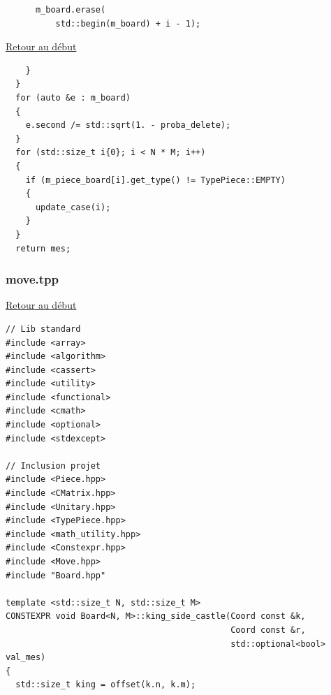 {\begin{frame}[fragile]
\begin{verbatim}
      m_board.erase(
          std::begin(m_board) + i - 1);
\end{verbatim}
\end{frame}

\begin{frame}[fragile]
\hyperlink{conclusion}{Retour au début}\newline
\begin{verbatim}
    }
  }
  for (auto &e : m_board)
  {
    e.second /= std::sqrt(1. - proba_delete);
  }
  for (std::size_t i{0}; i < N * M; i++)
  {
    if (m_piece_board[i].get_type() != TypePiece::EMPTY)
    {
      update_case(i);
    }
  }
  return mes;

\end{verbatim}
\end{frame}

\begin{frame}[fragile]
\label{move.tpp}
\frametitle{move.tpp}
\hyperlink{conclusion}{Retour au début}\newline
\begin{verbatim}
// Lib standard
#include <array>
#include <algorithm>
#include <cassert>
#include <utility>
#include <functional>
#include <cmath>
#include <optional>
#include <stdexcept>

// Inclusion projet
#include <Piece.hpp>
#include <CMatrix.hpp>
#include <Unitary.hpp>
#include <TypePiece.hpp>
#include <math_utility.hpp>
#include <Constexpr.hpp>
#include <Move.hpp>
#include "Board.hpp"

template <std::size_t N, std::size_t M>
CONSTEXPR void Board<N, M>::king_side_castle(Coord const &k,
                                             Coord const &r,
                                             std::optional<bool> val_mes)
{
  std::size_t king = offset(k.n, k.m);
\end{verbatim}
\end{frame}

}
